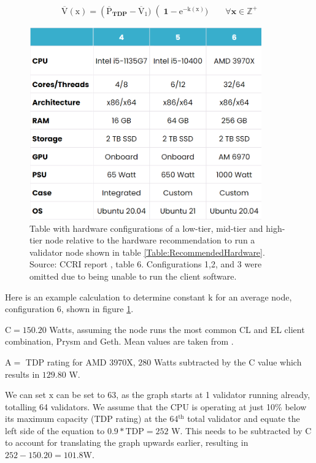 \begin{equation}
    \label{eqn:ExpDecay}
    \boldsymbol{\mathrm{\overline{V}(\mathrm{x})} = \left(\mathrm{\overline{P}}_{TDP} -\mathrm{\overline{V}_{1}} )\right(1-\mathrm{e}^{-\mathrm{k}(\mathrm{x})}) \qquad \forall x \in \mathbb{Z}^+}
\end{equation}


\begin{figure}[htb!]
    \centering
    \includegraphics[width=10cm,center]{Figures/CCRIhardwareConfigEdit.png}
    \caption{Table with hardware configurations of a low-tier, mid-tier and high-tier node relative to the hardware recommendation to run a validator node shown in table \ref{Table:RecommendedHardware}. Source: CCRI report \cite{CryptoCarbonRatingsInstitute2022TheNetwork}, table 6. Configurations 1,2, and 3 were omitted due to being unable to run the client software.}
    \label{Figure:CCRIhardwareConfig}
\end{figure}

\label{DetermineK}
Here is an example calculation to determine constant $\boldsymbol{\mathrm{k}}$ for an average node, configuration 6, shown in figure \ref{Figure:CCRIhardwareConfig}. 

$\boldsymbol{\mathrm{C}} = \boldsymbol{\mathrm{150.20}} $ Watts, assuming the node runs the most common CL and EL client combination, Prysm and Geth. Mean values are taken from  \cite{CryptoCarbonRatingsInstitute2022TheNetwork}.

$\boldsymbol{\mathrm{A}} = $ TDP rating for AMD 3970X, $\boldsymbol{\mathrm{280}} $ Watts \cite{AMDDatabase} subtracted by the $\boldsymbol{\mathrm{C}}$ value which results in $\boldsymbol{\mathrm{129.80}}$ W.

We can set $\boldsymbol{\mathrm{x}} $ can be set to $\boldsymbol{\mathrm{63}} $, as the graph starts at 1 validator running already, totalling 64 validators. We assume that the CPU is operating at just 10\% below its maximum capacity (TDP rating) at the 64$^\mathrm{{th}}$ total validator and equate the left side of the equation to $\boldsymbol{\mathrm{0.9 * TDP}} = 252$ W. This needs to be subtracted by $\boldsymbol{\mathrm{C}}$ to account for translating the graph upwards earlier, resulting in $\boldsymbol{\mathrm{252-150.20 = 101.8}}$W. 

